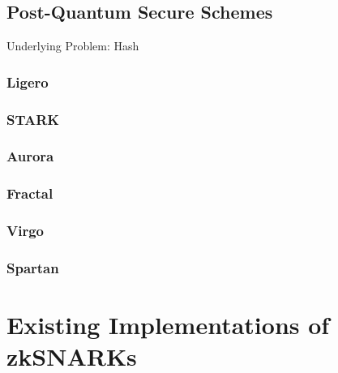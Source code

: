 
\subsection{Post-Quantum Secure Schemes}
Underlying Problem: Hash

\subsubsection{Ligero}

\subsubsection{STARK}

\subsubsection{Aurora}

\subsubsection{Fractal}

\subsubsection{Virgo}

\subsubsection{Spartan}



\section{Existing Implementations of zkSNARKs}
